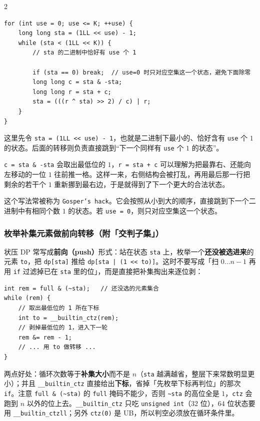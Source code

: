 \begin{multicols*}{2}
		\begin{verbatim}
for (int use = 0; use <= K; ++use) {
	long long sta = (1LL << use) - 1;
	while (sta < (1LL << K)) {
		// sta 的二进制中恰好有 use 个 1

		if (sta == 0) break;  // use=0 时只对应空集这一个状态，避免下面除零
		long long c = sta & -sta;
		long long r = sta + c;
		sta = (((r ^ sta) >> 2) / c) | r;
	}
}
		\end{verbatim}

		这里先令 \texttt{sta = (1LL << use) - 1}，也就是二进制下最小的、恰好含有 \texttt{use} 个 $1$ 的状态。后面的转移则负责直接跳到“下一个同样有 \texttt{use} 个 $1$ 的状态”。

		\texttt{c = sta \& -sta} 会取出最低位的 $1$，\texttt{r = sta + c} 可以理解为把最靠右、还能向左移动的一位 $1$ 往前推一格。这样一来，右侧结构会被打乱，再用最后那一行把剩余的若干个 $1$ 重新挪到最右边，于是就得到了下一个更大的合法状态。

		这个写法常被称为 \texttt{Gosper's hack}。它会按照从小到大的顺序，直接跳到下一个二进制中有相同个数 $1$ 的状态。若 \texttt{use = 0}，则只对应空集这一个状态。

		\subsubsection{枚举补集元素做前向转移（附「交判子集」）}

		状压 DP 常写成\textbf{前向（push）}形式：站在状态 \texttt{sta} 上，枚举一个\textbf{还没被选进来}的元素 \texttt{to}，把 \texttt{dp[sta]} 推给 \texttt{dp[sta | (1 << to)]}。这时不要写成「扫 $0 \ldots n-1$ 再用 \texttt{if} 过滤掉已在 \texttt{sta} 里的位」，而是直接把补集掏出来逐位剥：

		\begin{verbatim}
int rem = full & (~sta);   // 还没选的元素集合
while (rem) {
	// 取出最低位的 1 所在下标
	int to = __builtin_ctz(rem);
	// 剥掉最低位的 1，进入下一轮
	rem &= rem - 1;
	// ... 用 to 做转移 ...
}
		\end{verbatim}

		两点好处：循环次数等于\textbf{补集大小}而不是 $n$（\texttt{sta} 越满越省，整层下来常数明显更小）；并且 \texttt{\_\_builtin\_ctz} 直接给出\textbf{下标}，省掉「先枚举下标再判位」的那次 \texttt{if}。注意 \texttt{full \& (\textasciitilde sta)} 的 \texttt{full} 掩码不能少，否则 \texttt{\textasciitilde sta} 的高位全是 $1$，\texttt{ctz} 会跑到 $n$ 以外的位上去。\texttt{\_\_builtin\_ctz} 只吃 \texttt{unsigned int}（$32$ 位），$64$ 位状态要用 \texttt{\_\_builtin\_ctzll}；另外 \texttt{ctz(0)} 是 UB，所以判空必须放在循环条件里。


\end{multicols*}
